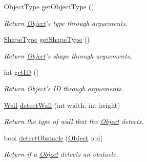 \begin{DoxyCompactItemize}
\hyperlink{Object_8h_a842c5e2e69277690b064bf363c017980}{Object\-Type} \hyperlink{classObject_acc41783171d260422196748e94109d55}{get\-Object\-Type} ()
\begin{DoxyCompactList}\small\item\em Return \hyperlink{classObject}{Object}'s type through arguements. \end{DoxyCompactList}\item 
\hyperlink{Object_8h_a5a4538eeab397888d88a4eefcc5a1345}{Shape\-Type} \hyperlink{classObject_a2db9eb28fac0df737c873b03a32cabdf}{get\-Shape\-Type} ()
\begin{DoxyCompactList}\small\item\em Return \hyperlink{classObject}{Object}'s shape through arguements. \end{DoxyCompactList}\item 
int \hyperlink{classObject_a99a8389a22915067650a7f5fb9167c03}{get\-I\-D} ()
\begin{DoxyCompactList}\small\item\em Return \hyperlink{classObject}{Object}'s I\-D through arguements. \end{DoxyCompactList}\item 
\hyperlink{Object_8h_ad4f6886266572e51d198a61a6c762ce5}{Wall} \hyperlink{classObject_a36771a8ad58bb897cfc593ad76965706}{detect\-Wall} (int width, int height)
\begin{DoxyCompactList}\small\item\em Return the type of wall that the \hyperlink{classObject}{Object} detects. \end{DoxyCompactList}\item 
bool \hyperlink{classObject_a0f6c6090fa37066c35b7688f4012085b}{detect\-Obstacle} (\hyperlink{classObject}{Object} obj)
\begin{DoxyCompactList}\small\item\em Return if a \hyperlink{classObject}{Object} detects an obstacle. \end{DoxyCompactList}\end{DoxyCompactItemize}
